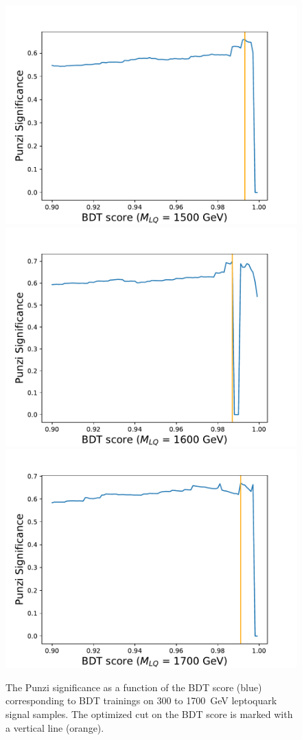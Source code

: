 \begin{figure}[H]
    {\includegraphics[width=.32\textwidth]{Images/Analysis/Results_combined_Unblinded/Plots/Optimization/Opt_BDT_M1500.pdf}}
    {\includegraphics[width=.32\textwidth]{Images/Analysis/Results_combined_Unblinded/Plots/Optimization/Opt_BDT_M1600.pdf}}
    {\includegraphics[width=.32\textwidth]{Images/Analysis/Results_combined_Unblinded/Plots/Optimization/Opt_BDT_M1700.pdf}}
    \caption{The Punzi significance as a function of the BDT score (blue) corresponding to BDT trainings on 300 to \SI{1700}{GeV} leptoquark signal samples. The optimized cut on the BDT score is marked with a vertical line (orange).
    \label{figapp:punzivsbdt1}}
\end{figure}


